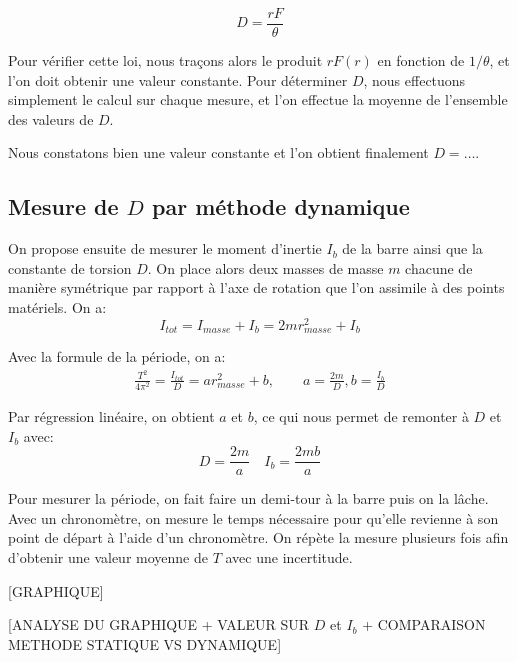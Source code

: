 \documentclass[12pt]{article}
\begin{document}
\begin{equation}
    D = \frac{rF}{\theta}
\end{equation}

Pour vérifier cette loi, nous traçons alors le produit $rF(r)$ en fonction de $1/\theta$, et l'on doit obtenir une valeur constante. Pour déterminer $D$,
nous effectuons simplement le calcul sur chaque mesure, et l'on effectue la moyenne de l'ensemble des valeurs de $D$.

Nous constatons bien une valeur constante et l'on obtient finalement $D = \dots$.


\subsection{Mesure de $D$ par méthode dynamique}
On propose ensuite de mesurer le moment d'inertie $I_b$ de la barre ainsi que la constante de torsion $D$. 
On place alors deux masses de masse $m$ chacune de manière symétrique par rapport à l'axe de rotation que l'on assimile à des points matériels. On a:
\begin{equation}
    I_{tot} = I_{masse} + I_b = 2mr_{masse}^2 + I_b
\end{equation}

Avec la formule de la période, on a:
\begin{align*}
    \frac{T^2}{4\pi^2} = \frac{I_{tot}}{D} = ar_{masse}^2 + b, \quad \quad a = \frac{2m}{D}, b=\frac{I_b}{D}
\end{align*}

Par régression linéaire, on obtient $a$ et $b$, ce qui nous permet de remonter à $D$ et $I_b$ avec:
\begin{equation}
    D = \frac{2m}{a} \quad I_b = \frac{2mb}{a}
\end{equation}

Pour mesurer la période, on fait faire un demi-tour à la barre puis on la lâche. Avec un chronomètre, 
on mesure le temps nécessaire pour qu'elle revienne à son point de départ à l'aide d'un chronomètre. On répète la mesure plusieurs fois
afin d'obtenir une valeur moyenne de $T$ avec une incertitude.

\break

[GRAPHIQUE]

[ANALYSE DU GRAPHIQUE + VALEUR SUR $D$ et $I_b$ + COMPARAISON METHODE STATIQUE VS DYNAMIQUE]
\end{document}
